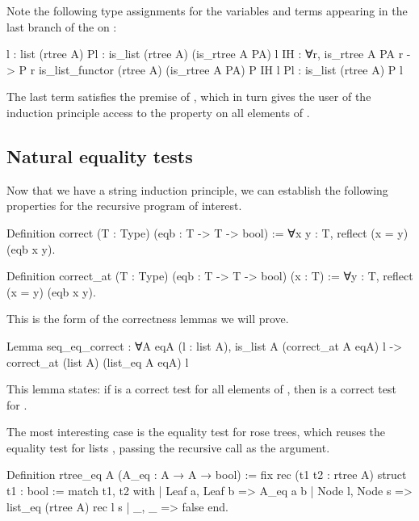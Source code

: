 \documentclass[a4paper, 11pt]{book}
\begin{document}
Note the following type assignments for the variables and terms appearing in
the last branch of the  on :

\begin{rocqcode}
l  : list (rtree A)
Pl : is_list (rtree A) (is_rtree A PA) l
IH : ∀r, is_rtree A PA r -> P r
is_list_functor (rtree A) (is_rtree A PA) P IH l Pl :
  is_list (rtree A) P l
\end{rocqcode}

The last term satisfies the premise of , which in turn gives
the user of the induction principle access to the property  on all
elements of .

\subsection{Natural equality tests}


Now that we have a string induction principle, we can establish the following
properties for the recursive program of interest.

\begin{rocqcode}
Definition correct (T : Type) (eqb : T -> T -> bool) :=
  ∀x y : T, reflect (x = y) (eqb x y).

Definition correct_at (T : Type) (eqb : T -> T -> bool) (x : T) :=
  ∀y : T, reflect (x = y) (eqb x y).
\end{rocqcode}

This is the form of the correctness lemmas we will prove.

\begin{rocqcode}
Lemma seq_eq_correct : ∀A eqA (l : list A),
  is_list A (correct_at A eqA) l ->
    correct_at (list A) (list_eq A eqA) l
\end{rocqcode}

This lemma states: if  is a correct test for all elements of
, then  is a correct test for .

The most interesting case is the equality test for rose trees, which reuses
the equality test for lists , passing the recursive call as the
 argument.

\begin{rocqcode}
Definition rtree_eq A (A_eq : A → A → bool) :=
  fix rec (t1 t2 : rtree A) {struct t1} : bool :=
    match t1, t2 with
    | Leaf a, Leaf b => A_eq a b
    | Node l, Node s => list_eq (rtree A) rec l s
    | _, _ => false
    end.
\end{rocqcode}
\end{document}
